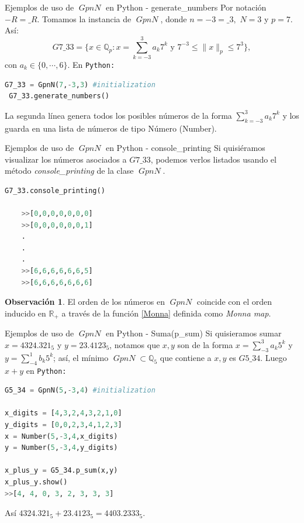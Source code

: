 \documentclass{beamer}
\theoremstyle{definition}
\numberwithin{equation}{section}
\newcommand{\redd}[1]{\textcolor{rkColor}{#1}}
\newtheorem{rr}{\redd{Observación}}
\renewcommand{\leq}{\leqslant}
\newcommand{\R}{\mathbb{R}}
\newcommand{\Q}{\mathbb{Q}}
\newcommand{\Qp}{\mathbb{Q}_p}
\newcommand{\pnorm}[1]{\|#1\|_p}
\DeclareMathOperator{\gpn}{\mathit{{GpnN}}}
\begin{document}
\begin{frame}[fragile]{Ejemplos de uso de $\gpn$ en Python - generate\_numbers }
	Por notación $-{R}=\_R$. Tomamos la instancia de $\gpn$, donde ${n=-3=\_{3},}$ $N=3$ y $p=7$. Así:  
	\begin{equation}\label{finite_number}
	\mathit{G7\_{3}3} = \Big\{x\in \Qp : x = \sum_{k=-3}^{3} a_{k} 7^{k} \text{ y } 7^{-3}\leq\pnorm{x}\leq 7^3\Big\},
	\end{equation}
 con $a_k\in \{0,\cdots,6\}$. En \texttt{Python:}
 \begin{lstlisting}[language = Python, caption = Inicialización de la clase $\mathit{G7\_33}$,basicstyle=\tiny]
 G7_33 = GpnN(7,-3,3) #initialization
 G7_33.generate_numbers()
 \end{lstlisting}
 La segunda línea genera todos los posibles números de la forma $ \sum_{k=-3}^{3} a_{k} 7^{k}$ y los guarda en una lista de números de tipo Número   (Number).
\end{frame}

\begin{frame}[fragile]{Ejemplos de uso de $\gpn$ en Python - console\_printing }
	Si quisiéramos visualizar los números asociados a $\mathit{G7\_{3}3}$, podemos verlos listados usando el método \textit{console\_printing} de la clase $\gpn$.
	\begin{lstlisting}[language = Python, caption = Visualización de números en $\mathit{G7\_33}$,basicstyle=\tiny]
	G7_33.console_printing()
	
	>>[0,0,0,0,0,0,0]
	>>[0,0,0,0,0,0,1]
	.
	.
	.      
	>>[6,6,6,6,6,6,5]
	>>[6,6,6,6,6,6,6]
	\end{lstlisting}
	\begin{rr}
		El orden de los números en $\gpn$ coincide con el orden inducido en $\R_+$ a través de la función \ref{Monna} definida como \textit{Monna map}.
	\end{rr}
\end{frame}

\begin{frame}[fragile]{Ejemplos de uso de $\gpn$ en Python - Suma(p\_sum) }
Si quisieramos sumar $ x =4324.321_5$ y $y=23.4123_5$, notamos que $x,y$ son de la  forma $x=\sum_{-3}^{3}a_k5^k$ y $y=\sum_{-4}^{1}b_k5^k$; así, el mínimo $\gpn\subset\Q_5$ que contiene a $x,y$ es $G5\_{3}4$. Luego $x+y$ en \texttt{Python:}

\begin{lstlisting}[language = Python, caption = suma de números en $\mathit{G5\_34}$, basicstyle=\tiny]
G5_34 = GpnN(5,-3,4) #initialization

x_digits = [4,3,2,4,3,2,1,0]
y_digits = [0,0,2,3,4,1,2,3]
x = Number(5,-3,4,x_digits)
y = Number(5,-3,4,y_digits)

x_plus_y = G5_34.p_sum(x,y)
x_plus_y.show()
>>[4, 4, 0, 3, 2, 3, 3, 3]

\end{lstlisting}
Así $ 4324.321_5+23.4123_5=4403.2333_5$.
\end{frame}
\end{document}
